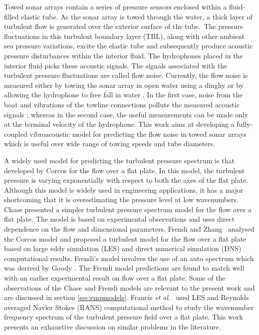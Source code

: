 \documentclass[11pt,cleanfoot]{asme2ej}
\begin{document}
Towed sonar arrays contain a series of pressure sensors enclosed within a fluid-filled elastic tube. As the sonar array is towed through the water, a thick layer of turbulent flow is generated over the exterior surface of the tube.~The pressure fluctuations in this turbulent boundary layer (TBL), along with other ambient sea pressure variations, excite the elastic tube and subsequently produce acoustic pressure disturbances within the interior fluid. The hydrophones placed in the interior fluid picks these acoustic signals. The signals associated with the turbulent pressure fluctuations are called flow noise. Currently, the flow noise is measured either by towing the sonar array in open water using a dinghy or by allowing the hydrophone to free fall in water \cite{Sarath2010}. In the first case, noise from the boat and vibrations of the towline connections pollute the measured acoustic signals \cite{Unni2011}; whereas in the second case, the useful measurements can be made only at the terminal velocity of the hydrophone. This work aims at developing a fully-coupled vibroacoustic model for predicting the flow noise in towed sonar arrays which is useful over wide range of towing speeds and tube diameters.

A widely used model for predicting the turbulent pressure spectrum is that developed by Corcos \cite{corcos1963} for the flow over a flat plate. In this model, the turbulent pressure is varying exponentially with respect to both the axes of the flat plate. Although this model is widely used in engineering applications, it has a major shortcoming that it is overestimating the pressure level at low wavenumbers. Chase \cite{Chase1981} presented a simpler turbulent pressure spectrum model for the flow over a flat plate. The model is based on experimental observations and uses direct dependence on the flow and dimensional parameters. Frendi and Zhang~\cite{frendi2020} analysed the Corcos \cite{corcos1963} model and proposed a turbulent model for the flow over a flat plate based on large eddy simulation (LES) and direct numerical simulation (DNS) computational results. Frendi's model involves the use of an auto spectrum which was derived by Goody \cite{goody2004}. The Frendi model predictions are found to match well with an earlier experimental result on flow over a flat plate. Some of the observations of the Chase and Frendi models are relevant to the present work and are discussed in section \ref{sec:empmodels}. Francis \textit{et al}.~\cite{francis2023} used LES and Reynolds averaged Navier Stokes (RANS) computational method to study the wavenumber frequency spectrum of the turbulent pressure field over a flat plate. This work presents an exhaustive discussion on similar problems in the literature.
\end{document}
